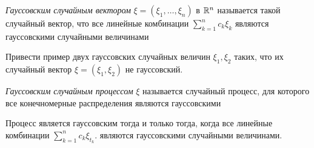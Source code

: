 \begin{reminder}
	\textit{Гауссовским случайным вектором} $\xi = (\xi_1, \ldots, \xi_n)$ в $\mathbb{R}^n$ называется такой случайный вектор, что все линейные комбинации $\sum_{k = 1}^n c_k\xi_k$ являются гауссовскими случайными величинами
\end{reminder}

\begin{exercise}
	Привести пример двух гауссовских случайных величин $\xi_1, \xi_2$ таких, что их случайный вектор $\xi = (\xi_1, \xi_2)$ не гауссовский.
\end{exercise}

\begin{definition}
	\textit{Гауссовским случайным процессом} $\xi$ называется случайный процесс, для которого все конечномерные распределения являются гауссовскими
\end{definition}

\begin{proposition}
	Процесс является гауссовским тогда и только тогда, когда все линейные комбинации $\sum_{k = 1}^n c_k\xi_{t_k}$. являются гауссовскими случайными величинами.
\end{proposition}
